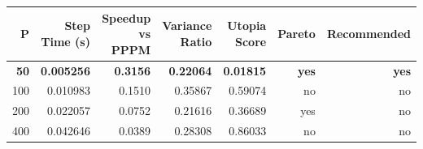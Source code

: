 \begin{tabular}{rrrrrrr}
\toprule
P & Step Time (s) & Speedup vs PPPM & Variance Ratio & Utopia Score & Pareto & Recommended \\
\midrule
\textbf{50} & \textbf{0.005256} & \textbf{0.3156} & \textbf{0.22064} & \textbf{0.01815} & \textbf{yes} & \textbf{yes} \\
100 & 0.010983 & 0.1510 & 0.35867 & 0.59074 & no & no \\
200 & 0.022057 & 0.0752 & 0.21616 & 0.36689 & yes & no \\
400 & 0.042646 & 0.0389 & 0.28308 & 0.86033 & no & no \\
\bottomrule
\end{tabular}
